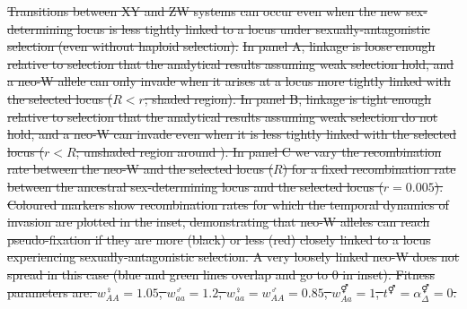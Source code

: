\documentclass[10pt,letterpaper]{article}
\providecommand{\DIFdel}[1]{{\protect\color{red}\sout{#1}}}                      %
\providecommand{\DIFdelFL}[1]{\DIFdel{#1}} %
\begin{document}
{%
\DIFdelFL{Transitions between XY and ZW systems can occur even when the new sex-determining locus is less tightly linked to a locus under sexually-antagonistic selection (even without haploid selection).}%
\DIFdelFL{In panel A, linkage is loose enough relative to selection that the analytical results assuming weak selection hold, and a neo-W allele can only invade when it arises at a locus more tightly linked with the selected locus ($R<r$; shaded region).
In panel B, linkage is tight enough relative to selection that the analytical results assuming weak selection do not hold, and a neo-W can invade even when it is less tightly linked with the selected locus ($r<R$; unshaded region around \text{*}).
In panel C we vary the recombination rate between the neo-W and the selected locus ($R$) for a fixed recombination rate between the ancestral sex-determining locus and the selected locus ($r=0.005$). 
Coloured markers show recombination rates for which the temporal dynamics of invasion are plotted in the inset, demonstrating that neo-W alleles can reach pseudo-fixation if they are more (black) or less (red) closely linked to a locus experiencing sexually-antagonistic selection. 
A very loosely linked neo-W does not spread in this case (blue and green lines overlap and go to 0 in inset). 
Fitness parameters are: $w_{AA}^\female = 1.05$, $w_{aa}^\male = 1.2$, $w_{aa}^\female = w_{AA}^\male = 0.85$, $w_{Aa}^\Hermaphrodite = 1$,  $t^\Hermaphrodite = \alpha^\Hermaphrodite_\Delta = 0$.
}}
\end{document}
